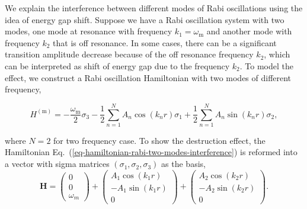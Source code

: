 \documentclass[%
reprint,
 amsmath,amssymb,
 prd,
]{revtex4-1}
\begin{document}
We explain the interference between different modes of Rabi oscillations using the idea of energy gap shift. Suppose we have a Rabi oscillation system with two modes, one mode at resonance with frequency $k_1=\omega_{\mathrm m}$ and another mode with frequency $k_2$ that is off resonance. In some cases, there can be a significant transition amplitude decrease because of the off resonance frequency $k_2$, which can be interpreted as shift of energy gap due to the frequency $k_2$. To model the effect, we construct a Rabi oscillation Hamiltonian with two modes of different frequency,
\begin{widetext}
\begin{equation}
H^{(\mathrm{m})}  = -\frac{\omega_{\mathrm{m}}}{2} \sigma_3 - \frac{1}{2} \sum_{n=1}^N  A_n \cos (k_n r) \sigma_1 + \frac{1}{2} \sum_{n=1}^N  A_n \sin (k_n r) \sigma_2,
\label{eq-hamiltonian-rabi-two-modes-interference}
\end{equation}
\end{widetext}
where $N=2$ for two frequency case. To show the destruction effect, the Hamiltonian Eq.~(\ref{eq-hamiltonian-rabi-two-modes-interference}) is reformed into a vector with sigma matrices $(\sigma_1,\sigma_2,\sigma_3)$ as the basis,
\begin{equation}
\mathbf H = \begin{pmatrix}
0\\
0\\
\omega_m
\end{pmatrix} + \begin{pmatrix}
A_1 \cos (k_1 r)\\
-A_1 \sin (k_1 r)\\
0
\end{pmatrix} + \begin{pmatrix}
A_2 \cos (k_2 r)\\
-A_2 \sin (k_2 r)\\
0
\end{pmatrix}.
\end{equation}
\end{document}
